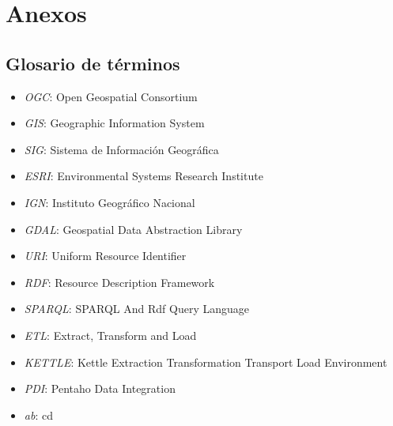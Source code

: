 \chapter{Anexos}
\section{Glosario de términos}
\begin{itemize}
    \item \textit{OGC}: Open Geospatial Consortium
    \item \textit{GIS}: Geographic Information System
    \item \textit{SIG}: Sistema de Información Geográfica
    \item \textit{ESRI}: Environmental Systems Research Institute
    \item \textit{IGN}: Instituto Geográfico Nacional
    \item \textit{GDAL}: Geospatial Data Abstraction Library
    \item \textit{URI}: Uniform Resource Identifier
    \item \textit{RDF}: Resource Description Framework
    \item \textit{SPARQL}: SPARQL And Rdf Query Language
    \item \textit{ETL}: Extract, Transform and Load
    \item \textit{KETTLE}: Kettle Extraction Transformation Transport Load Environment
    \item \textit{PDI}: Pentaho Data Integration
    \item \textit{ab}: cd
\end{itemize}





 
